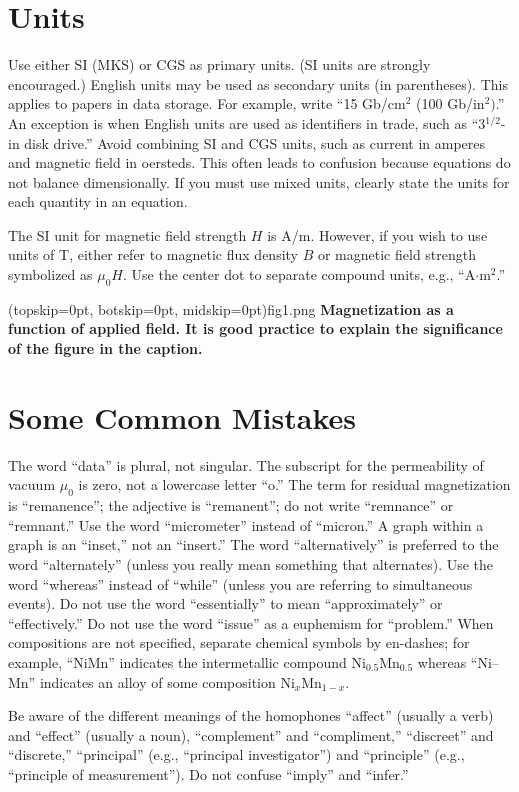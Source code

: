 \documentclass{ieeeaccess}
\begin{document}
\section{Units}
Use either SI (MKS) or CGS as primary units. (SI units are strongly
encouraged.) English units may be used as secondary units (in parentheses).
This applies to papers in data storage. For example, write ``15
Gb/cm$^{2}$ (100 Gb/in$^{2})$.'' An exception is when
English units are used as identifiers in trade, such as ``3$^{1\!/\!2}$-in
disk drive.'' Avoid combining SI and CGS units, such as current in amperes
and magnetic field in oersteds. This often leads to confusion because
equations do not balance dimensionally. If you must use mixed units, clearly
state the units for each quantity in an equation.

The SI unit for magnetic field strength $H$ is A/m. However, if you wish to use
units of T, either refer to magnetic flux density $B$ or magnetic field
strength symbolized as $\mu _{0}H$. Use the center dot to separate
compound units, e.g., ``A$\cdot $m$^{2}$.''


\Figure[t!](topskip=0pt, botskip=0pt, midskip=0pt){fig1.png}
{ \textbf{Magnetization as a function of applied field.
It is good practice to explain the significance of the figure in the caption.}\label{fig1}}

\section{Some Common Mistakes}
The word ``data'' is plural, not singular. The subscript for the
permeability of vacuum $\mu _{0}$ is zero, not a lowercase letter
``o.'' The term for residual magnetization is ``remanence''; the adjective
is ``remanent''; do not write ``remnance'' or ``remnant.'' Use the word
``micrometer'' instead of ``micron.'' A graph within a graph is an
``inset,'' not an ``insert.'' The word ``alternatively'' is preferred to the
word ``alternately'' (unless you really mean something that alternates). Use
the word ``whereas'' instead of ``while'' (unless you are referring to
simultaneous events). Do not use the word ``essentially'' to mean
``approximately'' or ``effectively.'' Do not use the word ``issue'' as a
euphemism for ``problem.'' When compositions are not specified, separate
chemical symbols by en-dashes; for example, ``NiMn'' indicates the
intermetallic compound Ni$_{0.5}$Mn$_{0.5}$ whereas
``Ni--Mn'' indicates an alloy of some composition
Ni$_{x}$Mn$_{1-x}$.

Be aware of the different meanings of the homophones ``affect'' (usually a
verb) and ``effect'' (usually a noun), ``complement'' and ``compliment,''
``discreet'' and ``discrete,'' ``principal'' (e.g., ``principal
investigator'') and ``principle'' (e.g., ``principle of measurement''). Do
not confuse ``imply'' and ``infer.''
\end{document}
